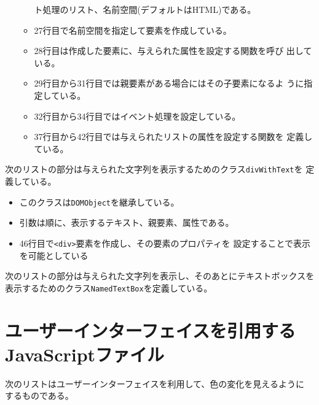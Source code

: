 \begin{itemize}
\begin{itemize}
              ト処理のリスト、名前空間(デフォルトはHTML)である。
        \item 27行目で名前空間を指定して要素を作成している。
        \item 28行目は作成した要素に、与えられた属性を設定する関数を呼び
              出している。
        \item 29行目から31行目では親要素がある場合にはその子要素になるよ
              うに指定している。
        \item 32行目から34行目ではイベント処理を設定している。
        \item 37行目から42行目では与えられたリストの属性を設定する関数を
              定義している。
       \end{itemize}
\end{itemize}
次のリストの部分は与えられた文字列を表示するためのクラス\texttt{divWithText}を
定義している。
\begin{itemize}
 \item このクラスは\texttt{DOMObject}を継承している。
 \item 引数は順に、表示するテキスト、親要素、属性である。
 \item 46行目で\texttt{<div>}要素を作成し、その要素のプロパティを
       設定することで表示を可能としている
\end{itemize}
次のリストの部分は与えられた文字列を表示し、そのあとにテキストボックスを
表示するためのクラス\texttt{NamedTextBox}を定義している。
 \section{ユーザーインターフェイスを引用するJavaScriptファイル}
 次のリストはユーザーインターフェイスを利用して、色の変化を見えるように
 するものである。
 
